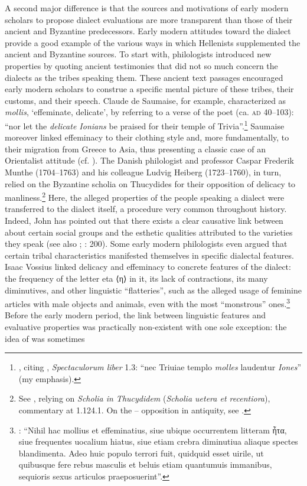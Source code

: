 A second major difference is that the sources and motivations of early modern scholars to propose dialect evaluations are more transparent than those of their ancient and Byzantine predecessors. Early modern attitudes toward the  dialect provide a good example of the various ways in which Hellenists supplemented the ancient and Byzantine sources. To start with, philologists introduced new properties by quoting ancient testimonies that did not so much concern the dialects as the tribes speaking them. These ancient text passages encouraged early modern scholars to construe a specific mental picture of these tribes, their customs, and their speech. Claude de Saumaise, for example, characterized  as \textit{mollis}, ‘effeminate, delicate’, by referring to a verse of the  poet  (ca. \textsc{ad} 40–103): “nor let the \textit{delicate Ionians} be praised for their temple of Trivia”.\footnote{\citet[75]{Saumaise1643a}, citing , \textit{Spectaculorum liber} 1.3: “nec Triuiae templo \textit{molles} laudentur \textit{Iones}” (my emphasis).} Saumaise moreover linked  effeminacy to their clothing style and, more fundamentally, to their migration from Greece to Asia, thus presenting a classic case of an Orientalist attitude (cf. \citealt{Said2003}). The Danish philologist and professor Caspar Frederik Munthe (1704–1763) and his colleague Ludvig Heiberg (1723–1760), in turn, relied on the Byzantine scholia on Thucydides for their opposition of  delicacy to  manliness.\footnote{See \citet[15]{Munthe1748}, relying on \textit{Scholia in Thucydidem} (\textit{Scholia uetera et recentiora}), commentary at 1.124.1. On the – opposition in antiquity, see \citet{Cassio1984}.} Here, the alleged properties of the people speaking a dialect were transferred to the dialect itself, a procedure very common throughout history. Indeed, John \citet[66--68]{Edwards2009} has pointed out that there exists a clear causative link between  about certain social groups and the esthetic qualities attributed to the varieties they speak (see also \citealt{Silverstein2003}; \citealt{Preston2018}: 200). Some early modern philologists even argued that certain tribal characteristics manifested themselves in specific dialectal features. Isaac Vossius linked  delicacy and effeminacy to concrete features of the dialect: the frequency of the letter eta ⟨η⟩ in it, its lack of contractions, its many diminutives, and other linguistic “flatteries”, such as the alleged usage of feminine articles with male objects and animals, even with the most “monstrous” ones.\footnote{\citet[55]{Vossius1673}: “Nihil hac mollius et effeminatius, siue ubique occurrentem litteram ἦτα, siue frequentes uocalium hiatus, siue etiam crebra diminutiua aliaque spectes blandimenta. Adeo huic populo terrori fuit, quidquid esset uirile, ut quibusque fere rebus masculis et beluis etiam quantumuis immanibus, sequioris sexus articulos praeposuerint”.} Before the early modern period, the link between linguistic features and evaluative properties was practically non-existent with one sole exception: the idea of   was sometimes 